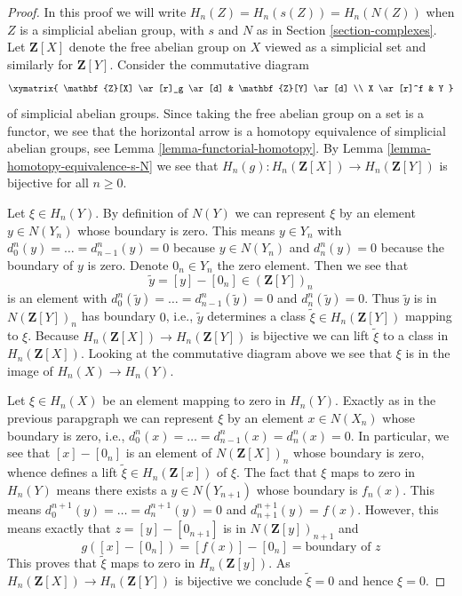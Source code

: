 \begin{proof}
In this proof we will write $H_n(Z) = H_n(s(Z)) = H_n(N(Z))$
when $Z$ is a simplicial abelian group, with $s$ and $N$ as in
Section \ref{section-complexes}.
Let $\mathbf{Z}[X]$ denote the free abelian group on $X$ viewed as
a simplicial set and similarly for $\mathbf{Z}[Y]$. Consider the
commutative diagram
$$
\xymatrix{
\mathbf{Z}[X] \ar[r]_g \ar[d] &
\mathbf{Z}[Y] \ar[d] \\
X \ar[r]^f & Y
}
$$
of simplicial abelian groups. Since taking the free abelian group on a set
is a functor, we see that the horizontal arrow is a homotopy equivalence of
simplicial abelian groups, see Lemma \ref{lemma-functorial-homotopy}.
By Lemma \ref{lemma-homotopy-equivalence-s-N}
we see that $H_n(g) : H_n(\mathbf{Z}[X]) \to H_n(\mathbf{Z}[Y])$ is bijective
for all $n \geq 0$.

\medskip\noindent
Let $\xi \in H_n(Y)$. By definition of $N(Y)$ we can represent
$\xi$ by an element $y \in N(Y_n)$ whose boundary is zero.
This means $y \in Y_n$ with $d^n_0(y) = \ldots = d^n_{n - 1}(y) = 0$
because $y \in N(Y_n)$ and $d^n_n(y) = 0$ because the boundary
of $y$ is zero. Denote $0_n \in Y_n$ the zero element. Then we see that
$$
\tilde y = [y] - [0_n] \in (\mathbf{Z}[Y])_n
$$
is an element with $d^n_0(\tilde y) = \ldots = d^n_{n - 1}(\tilde y) = 0$
and $d^n_n(\tilde y) = 0$. Thus $\tilde y$ is in $N(\mathbf{Z}[Y])_n$
has boundary $0$, i.e., $\tilde y$ determines a
class $\tilde \xi \in H_n(\mathbf{Z}[Y])$ mapping to $\xi$.
Because $H_n(\mathbf{Z}[X]) \to H_n(\mathbf{Z}[Y])$ is bijective
we can lift $\tilde \xi$ to a class in $H_n(\mathbf{Z}[X])$.
Looking at the commutative diagram above
we see that $\xi$ is in the image of $H_n(X) \to H_n(Y)$.

\medskip\noindent
Let $\xi \in H_n(X)$ be an element mapping to zero in $H_n(Y)$.
Exactly as in the previous parapgraph we can represent
$\xi$ by an element $x \in N(X_n)$ whose boundary is zero, i.e.,
$d^n_0(x) = \ldots = d^n_{n - 1}(x) = d^n_n(x) = 0$.
In particular, we see that $[x] - [0_n]$ is an element of
$N(\mathbf{Z}[X])_n$ whose boundary is zero, whence defines
a lift $\tilde \xi \in H_n(\mathbf{Z}[x])$ of $\xi$.
The fact that $\xi$ maps to zero in $H_n(Y)$
means there exists a $y \in N(Y_{n + 1})$ whose boundary is $f_n(x)$.
This means $d^{n + 1}_0(y) = \ldots = d^{n + 1}_n(y) = 0$ and
$d^{n + 1}_{n + 1}(y) = f(x)$.
However, this means exactly that
$z = [y] - [0_{n + 1}]$ is in $N(\mathbf{Z}[y])_{n + 1}$ and
$$
g([x] - [0_n]) = [f(x)] - [0_n] = \text{boundary of }z
$$
This proves that $\tilde \xi$ maps to zero in $H_n(\mathbf{Z}[y])$.
As $H_n(\mathbf{Z}[X]) \to H_n(\mathbf{Z}[Y])$ is bijective
we conclude $\tilde \xi = 0$ and hence $\xi = 0$.
\end{proof}






